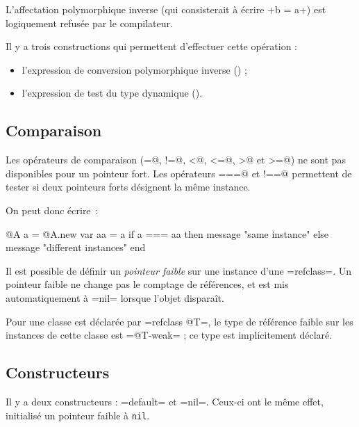 L'affectation polymorphique inverse (qui consisterait à écrire \ggsq+b = a+) est logiquement refusée par le compilateur.

Il y a trois constructions qui permettent d'effectuer cette opération :
\begin{itemize}
  \item l'expression de conversion polymorphique inverse () ;
  \item l'expression de test du type dynamique ().
\end{itemize}

\subsection{Comparaison}

Les opérateurs de comparaison (\ggsq@=@, \ggsq@!=@, \ggsq@<@, \ggsq@<=@, \ggsq@>@ et \ggsq@>=@) ne sont pas disponibles pour un pointeur fort. Les opérateurs \ggsq@===@ et \ggsq@!==@ permettent de tester si deux pointeurs forts désignent la même instance.


On peut donc écrire~:
\begin{galgas4}
  @A a = @A.new
  var aa = a
  if a === aa then
    message "same instance\n"
  else
    message "different instances\n"
  end
\end{galgas4}





Il est possible de définir un \emph{pointeur faible} sur une instance d'une \ggsq=refclass=. Un pointeur faible ne change pas le comptage de références, et est mis automatiquement à \ggsq=nil= lorsque l'objet disparaît.

Pour une classe est déclarée par \ggsq=refclass @T=, le type de référence faible sur les instances de cette classe est \ggsq=@T-weak= ; ce type est implicitement déclaré.







\subsection{Constructeurs}

Il y a deux constructeurs : \ggsq=default= et \ggsq=nil=. Ceux-ci ont le même effet, initialisé un pointeur faible à \texttt{nil}.

